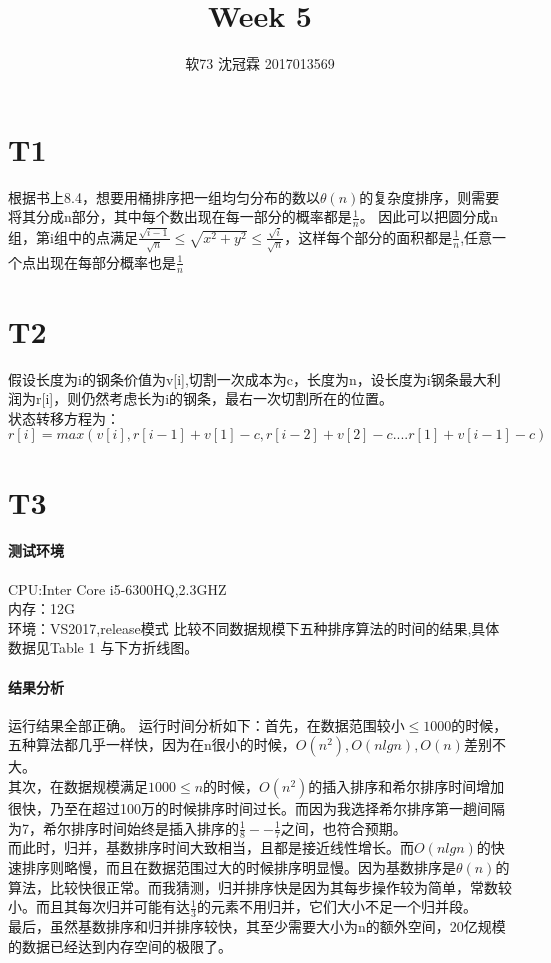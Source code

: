 \documentclass{article}
\title{Week 5}
\author{软73 沈冠霖 2017013569}
\begin{document}
\begin{CJK}{UTF8}{gkai}
\maketitle
\section{T1}
根据书上8.4，想要用桶排序把一组均匀分布的数以$\theta(n)$的复杂度排序，则需要将其分成n部分，其中每个数出现在每一部分的概率都是$\frac{1}{n}$。
因此可以把圆分成n组，第i组中的点满足$\frac{\sqrt{i-1}}{\sqrt{n}} \leq \sqrt{x^{2}+y^{2}} \leq \frac{\sqrt{i}}{\sqrt{n}}$，这样每个部分的面积都是$\frac{1}{n}$,任意一个点出现在每部分概率也是$\frac{1}{n}$
\section{T2}
假设长度为i的钢条价值为v[i],切割一次成本为c，长度为n，设长度为i钢条最大利润为r[i]，则仍然考虑长为i的钢条，最右一次切割所在的位置。\\
状态转移方程为：$r[i] = max(v[i],r[i-1]+v[1]-c,r[i-2]+v[2]-c....r[1]+v[i-1]-c)$\\



\section{T3} 
\paragraph{测试环境}
CPU:Inter Core i5-6300HQ,2.3GHZ\\
内存：12G\\
环境：VS2017,release模式
比较不同数据规模下五种排序算法的时间的结果,具体数据见Table 1 与下方折线图。\\
\paragraph{结果分析}
运行结果全部正确。
运行时间分析如下：首先，在数据范围较小$\leq 1000$的时候，五种算法都几乎一样快，因为在n很小的时候，$O(n^{2}),O(nlgn),O(n)$差别不大。\\
其次，在数据规模满足$1000\leq n$的时候，$O(n^2)$的插入排序和希尔排序时间增加很快，乃至在超过100万的时候排序时间过长。而因为我选择希尔排序第一趟间隔为7，希尔排序时间始终是插入排序的$\frac{1}{8}--\frac{1}{7}$之间，也符合预期。\\
而此时，归并，基数排序时间大致相当，且都是接近线性增长。而$O(nlgn)$的快速排序则略慢，而且在数据范围过大的时候排序明显慢。因为基数排序是$\theta(n)$的算法，比较快很正常。而我猜测，归并排序快是因为其每步操作较为简单，常数较小。而且其每次归并可能有达$\frac{1}{3}$的元素不用归并，它们大小不足一个归并段。\\
最后，虽然基数排序和归并排序较快，其至少需要大小为n的额外空间，20亿规模的数据已经达到内存空间的极限了。\\


\end{CJK}
\end{document}
